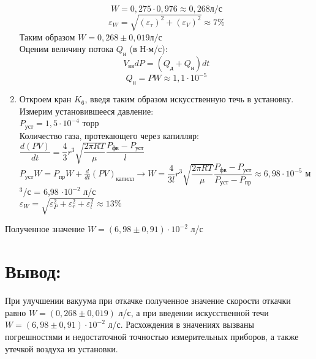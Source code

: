 \documentclass[a4paper,12pt]{article}
\theoremstyle{plain} %
\theoremstyle{definition} %
\theoremstyle{remark} %
\begin{document}
\begin{enumerate}
\[W = 0,275 \cdot 0,976 \approx 0,268 \textit{л/с}\]
\[ \varepsilon_W = \sqrt{ (\varepsilon_\tau)^2 + (\varepsilon_V)^2} \approx 7\% \]
Таким образом $W = 0,268 \pm 0,019 \textit{л/с}$ \\
Оценим величину потока $Q_\textit{н}$ (в Н$\cdot$м/с):
\[V_\textit{вв}dP = (Q_\textit{д} + Q_\textit{н})dt\]
\[Q_\textit{н} = PW \approx 1,1 \cdot 10^{-5}\]
\item
Откроем кран $K_6$, введя таким образом искусственную течь в установку. Измерим установившееся давление: \\
$P_\textit{уст} = 1,5 \cdot 10^{-4}$ торр \\
Количество газа, протекающего через капилляр: $\dfrac{d(PV)}{dt} = \dfrac{4}{3}r^3\sqrt{\dfrac{2\pi RT}{\mu}}\dfrac{P_\textit{фв} - P_\textit{уст}}{l}$  \\
$P_\textit{уст}W = P_\textit{пр}W + \frac{d}{dt}(PV)_\textit{капилл} \rightarrow W = \dfrac{4}{3l}r^3\sqrt{\dfrac{2\pi RT}{\mu}}\dfrac{P_\textit{фв} - P_\textit{уст}}{P_\textit{уст} - P_\textit{пр}} \approx 6,98\cdot 10^{-5}$ м$^3$/с = 6,98 $\cdot 10^{-2}$ л/с \\
$\varepsilon_W = \sqrt{\varepsilon_P^2 + \varepsilon_r^2 + \varepsilon_l^2} \approx 13 \%$
\end{enumerate}
Полученное значение $W = (6,98 \pm 0,91)  \cdot 10^{-2}$ л/с 
\section{Вывод:}
При улучшении вакуума при откачке полученное значение скорости откачки равно $W = (0,268 \pm 0,019)$ л/с, а при введении искусственной течи  $W = (6,98 \pm 0,91)  \cdot 10^{-2}$ л/с. Расхождения в значениях вызваны погрешностями и недостаточной точностью измерительных приборов, а также утечкой воздуха из установки.
\end{document}
